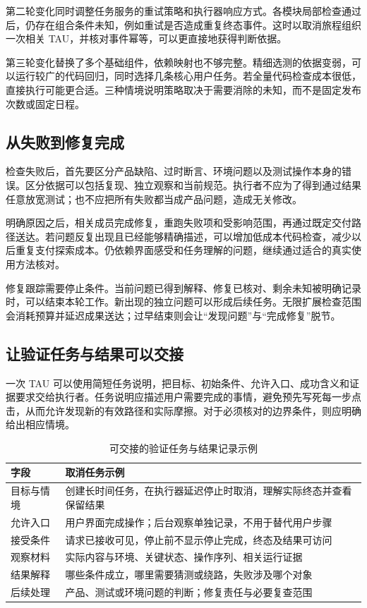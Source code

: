 第二轮变化同时调整任务服务的重试策略和执行器响应方式。各模块局部检查通过后，仍存在组合条件未知，例如重试是否造成重复终态事件。这时以取消旅程组织一次相关 TAU，并核对事件幂等，可以更直接地获得判断依据。

第三轮变化替换了多个基础组件，依赖映射也不够完整。精细选测的依据变弱，可以运行较广的代码回归，同时选择几条核心用户任务。若全量代码检查成本很低，直接执行可能更合适。三种情境说明策略取决于需要消除的未知，而不是固定发布次数或固定日程。

\subsection{从失败到修复完成}
检查失败后，首先要区分产品缺陷、过时断言、环境问题以及测试操作本身的错误。区分依据可以包括复现、独立观察和当前规范。执行者不应为了得到通过结果任意放宽测试；也不应把所有失败都当成产品问题，造成无关修改。

明确原因之后，相关成员完成修复，重跑失败项和受影响范围，再通过既定交付路径送达。若问题反复出现且已经能够精确描述，可以增加低成本代码检查，减少以后重复支付探索成本。仍依赖界面感受和任务理解的问题，继续通过适合的真实使用方法核对。

修复跟踪需要停止条件。当前问题已得到解释、修复已核对、剩余未知被明确记录时，可以结束本轮工作。新出现的独立问题可以形成后续任务。无限扩展检查范围会消耗预算并延迟成果送达；过早结束则会让“发现问题”与“完成修复”脱节。

\subsection{让验证任务与结果可以交接}
一次 TAU 可以使用简短任务说明，把目标、初始条件、允许入口、成功含义和证据要求交给执行者。任务说明应描述用户需要完成的事情，避免预先写死每一步点击，从而允许发现新的有效路径和实际摩擦。对于必须核对的边界条件，则应明确给出相应情境。

\begin{table}[htbp]\centering\small
\caption{可交接的验证任务与结果记录示例}\label{tab:tau-record}
\begin{tabularx}{\linewidth}{p{2.4cm}Y}\toprule
字段 & 取消任务示例\\\midrule
目标与情境 & 创建长时间任务，在执行器延迟停止时取消，理解实际终态并查看保留结果\\
允许入口 & 用户界面完成操作；后台观察单独记录，不用于替代用户步骤\\
接受条件 & 请求已接收可见，停止前不显示停止完成，终态及结果可访问\\
观察材料 & 实际内容与环境、关键状态、操作序列、相关运行证据\\
结果解释 & 哪些条件成立，哪里需要猜测或绕路，失败涉及哪个对象\\
后续处理 & 产品、测试或环境问题的判断；修复责任与必要复查范围\\\bottomrule
\end{tabularx}\end{table}

